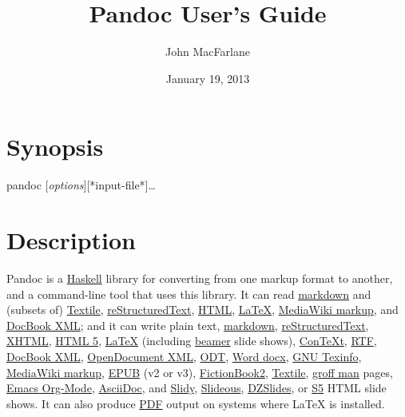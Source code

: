 \documentclass[]{article}
\title{Pandoc User's Guide}
\author{John MacFarlane}
\date{January 19, 2013}
\begin{document}
\maketitle

\section{Synopsis}

pandoc {[}\emph{options}{]}{[}*input-file*{]}\ldots{}

\section{Description}

Pandoc is a \href{http://www.haskell.org/}{Haskell} library for
converting from one markup format to another, and a command-line tool
that uses this library. It can read
\href{http://daringfireball.net/projects/markdown/}{markdown} and
(subsets of) \href{http://redcloth.org/textile}{Textile},
\href{http://docutils.sourceforge.net/docs/ref/rst/introduction.html}{reStructuredText},
\href{http://www.w3.org/TR/html40/}{HTML},
\href{http://www.latex-project.org/}{LaTeX},
\href{http://www.mediawiki.org/wiki/Help:Formatting}{MediaWiki markup},
and \href{http://www.docbook.org/}{DocBook XML}; and it can write plain
text, \href{http://daringfireball.net/projects/markdown/}{markdown},
\href{http://docutils.sourceforge.net/docs/ref/rst/introduction.html}{reStructuredText},
\href{http://www.w3.org/TR/xhtml1/}{XHTML},
\href{http://www.w3.org/TR/html5/}{HTML 5},
\href{http://www.latex-project.org/}{LaTeX} (including
\href{http://www.tex.ac.uk/CTAN/macros/latex/contrib/beamer}{beamer}
slide shows), \href{http://www.pragma-ade.nl/}{ConTeXt},
\href{http://en.wikipedia.org/wiki/Rich_Text_Format}{RTF},
\href{http://www.docbook.org/}{DocBook XML},
\href{http://opendocument.xml.org/}{OpenDocument XML},
\href{http://en.wikipedia.org/wiki/OpenDocument}{ODT},
\href{http://www.microsoft.com/interop/openup/openxml/default.aspx}{Word
docx}, \href{http://www.gnu.org/software/texinfo/}{GNU Texinfo},
\href{http://www.mediawiki.org/wiki/Help:Formatting}{MediaWiki markup},
\href{http://www.idpf.org/}{EPUB} (v2 or v3),
\href{http://www.fictionbook.org/index.php/Eng:XML_Schema_Fictionbook_2.1}{FictionBook2},
\href{http://redcloth.org/textile}{Textile},
\href{http://developer.apple.com/DOCUMENTATION/Darwin/Reference/ManPages/man7/groff_man.7.html}{groff
man} pages, \href{http://orgmode.org}{Emacs Org-Mode},
\href{http://www.methods.co.nz/asciidoc/}{AsciiDoc}, and
\href{http://www.w3.org/Talks/Tools/Slidy/}{Slidy},
\href{http://goessner.net/articles/slideous/}{Slideous},
\href{http://paulrouget.com/dzslides/}{DZSlides}, or
\href{http://meyerweb.com/eric/tools/s5/}{S5} HTML slide shows. It can
also produce \href{http://www.adobe.com/pdf/}{PDF} output on systems
where LaTeX is installed.
\end{document}
